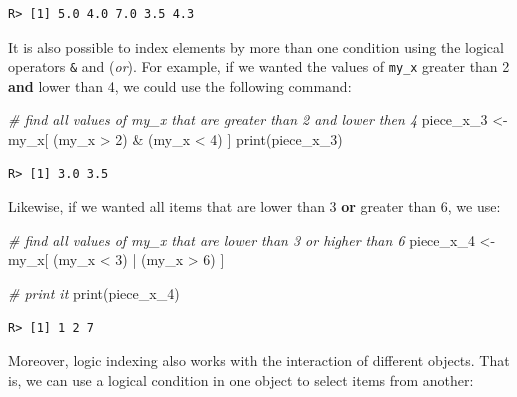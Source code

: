 \documentclass[
  12pt,
]{book}
\newenvironment{Shaded}{\begin{snugshade}}{\end{snugshade}}
\newcommand{\CommentTok}[1]{\textcolor[rgb]{0.37,0.37,0.37}{\textit{#1}}}
\newcommand{\DecValTok}[1]{\textcolor[rgb]{0.06,0.06,0.06}{#1}}
\newcommand{\FunctionTok}[1]{\textcolor[rgb]{0,0,0}{#1}}
\newcommand{\NormalTok}[1]{#1}
\newcommand{\OtherTok}[1]{\textcolor[rgb]{0.37,0.37,0.37}{#1}}
\newcommand{\SpecialCharTok}[1]{\textcolor[rgb]{0,0,0}{#1}}
\begin{document}
\begin{verbatim}
R> [1] 5.0 4.0 7.0 3.5 4.3
\end{verbatim}

It is also possible to index elements by more than one condition using the logical operators \texttt{\&} and \texttt{\textbar{}} (\emph{or}). For example, if we wanted the values of \texttt{my\_x} greater than 2 \textbf{and} lower than 4, we could use the following command: 

\begin{Shaded}
\begin{Highlighting}[]
\CommentTok{\# find all values of my\_x that are greater than 2 and lower then 4}
\NormalTok{piece\_x\_3 }\OtherTok{\textless{}{-}}\NormalTok{ my\_x[ (my\_x }\SpecialCharTok{\textgreater{}} \DecValTok{2}\NormalTok{) }\SpecialCharTok{\&}\NormalTok{ (my\_x }\SpecialCharTok{\textless{}} \DecValTok{4}\NormalTok{) ]}
\FunctionTok{print}\NormalTok{(piece\_x\_3)}
\end{Highlighting}
\end{Shaded}

\begin{verbatim}
R> [1] 3.0 3.5
\end{verbatim}

Likewise, if we wanted all items that are lower than 3 \textbf{or} greater than 6, we use:

\begin{Shaded}
\begin{Highlighting}[]
\CommentTok{\# find all values of my\_x that are lower than 3 or higher than 6}
\NormalTok{piece\_x\_4 }\OtherTok{\textless{}{-}}\NormalTok{ my\_x[ (my\_x }\SpecialCharTok{\textless{}} \DecValTok{3}\NormalTok{) }\SpecialCharTok{|}\NormalTok{ (my\_x }\SpecialCharTok{\textgreater{}} \DecValTok{6}\NormalTok{) ]}

\CommentTok{\# print it}
\FunctionTok{print}\NormalTok{(piece\_x\_4)}
\end{Highlighting}
\end{Shaded}

\begin{verbatim}
R> [1] 1 2 7
\end{verbatim}

Moreover, logic indexing also works with the interaction of different objects. That is, we can use a logical condition in one object to select items from another:
\end{document}
